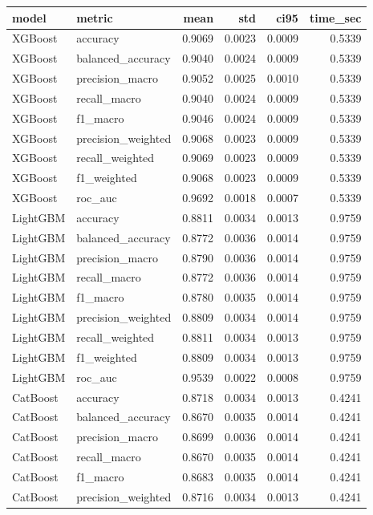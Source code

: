 \begin{tabular}{llrrrr}
\toprule
model & metric & mean & std & ci95 & time_sec \\
\midrule
XGBoost & accuracy & 0.9069 & 0.0023 & 0.0009 & 0.5339 \\
XGBoost & balanced_accuracy & 0.9040 & 0.0024 & 0.0009 & 0.5339 \\
XGBoost & precision_macro & 0.9052 & 0.0025 & 0.0010 & 0.5339 \\
XGBoost & recall_macro & 0.9040 & 0.0024 & 0.0009 & 0.5339 \\
XGBoost & f1_macro & 0.9046 & 0.0024 & 0.0009 & 0.5339 \\
XGBoost & precision_weighted & 0.9068 & 0.0023 & 0.0009 & 0.5339 \\
XGBoost & recall_weighted & 0.9069 & 0.0023 & 0.0009 & 0.5339 \\
XGBoost & f1_weighted & 0.9068 & 0.0023 & 0.0009 & 0.5339 \\
XGBoost & roc_auc & 0.9692 & 0.0018 & 0.0007 & 0.5339 \\
LightGBM & accuracy & 0.8811 & 0.0034 & 0.0013 & 0.9759 \\
LightGBM & balanced_accuracy & 0.8772 & 0.0036 & 0.0014 & 0.9759 \\
LightGBM & precision_macro & 0.8790 & 0.0036 & 0.0014 & 0.9759 \\
LightGBM & recall_macro & 0.8772 & 0.0036 & 0.0014 & 0.9759 \\
LightGBM & f1_macro & 0.8780 & 0.0035 & 0.0014 & 0.9759 \\
LightGBM & precision_weighted & 0.8809 & 0.0034 & 0.0014 & 0.9759 \\
LightGBM & recall_weighted & 0.8811 & 0.0034 & 0.0013 & 0.9759 \\
LightGBM & f1_weighted & 0.8809 & 0.0034 & 0.0013 & 0.9759 \\
LightGBM & roc_auc & 0.9539 & 0.0022 & 0.0008 & 0.9759 \\
CatBoost & accuracy & 0.8718 & 0.0034 & 0.0013 & 0.4241 \\
CatBoost & balanced_accuracy & 0.8670 & 0.0035 & 0.0014 & 0.4241 \\
CatBoost & precision_macro & 0.8699 & 0.0036 & 0.0014 & 0.4241 \\
CatBoost & recall_macro & 0.8670 & 0.0035 & 0.0014 & 0.4241 \\
CatBoost & f1_macro & 0.8683 & 0.0035 & 0.0014 & 0.4241 \\
CatBoost & precision_weighted & 0.8716 & 0.0034 & 0.0013 & 0.4241 \\

\end{tabular}
